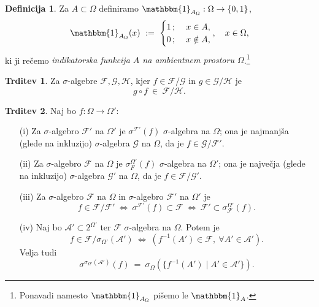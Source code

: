 \documentclass[11pt]{article}
\newcommand{\A}{\mathcal{A}}
\newcommand{\F}{\mathcal{F}}
\newcommand{\G}{\mathcal{G}}
\renewcommand{\H}{\mathcal{H}}
\newcommand{\set}[1]{\{#1\}}
\newcommand{\1}{\mathbbm{1}}
\theoremstyle{definition}
\newtheorem{definicija}{Definicija}[section]
\theoremstyle{definition}
\newtheorem{trditev}{Trditev}[section]
\theoremstyle{definition}
\theoremstyle{definition}
\begin{document}
\begin{definicija}

Za $A \subset \Omega$ definiramo $\1_{A_\Omega}: \Omega \rightarrow \set{0,1}$,
$$\1_{A_\Omega}(x) ~:=~ \begin{cases}
1\,; ~&x \in A, \\
0\,; ~&x \notin A,
\end{cases}, ~~~x \in \Omega,$$
ki ji rečemo \textit{indikatorska funkcija $A$ na ambientnem prostoru $\Omega$}.\footnote{Ponavadi namesto $\1_{A_\Omega}$ pišemo le $\1_A$.}

\end{definicija}
\vspace{0.5cm}

\begin{trditev}

Za $\sigma$-algebre $\F,\G,\H$, kjer $f \in \F/\G$ in $g \in \G/\H$ je
$$g \circ f ~\in~ \F/\H.$$

\end{trditev}
\vspace{0.5cm}

\begin{trditev}

Naj bo $f: \Omega \rightarrow \Omega'$:
\begin{enumerate}

\item[(i)] Za $\sigma$-algebro $\F'$ na $\Omega'$ je $\sigma^{\F'}(f)$ $\sigma$-algebra na $\Omega$; ona je najmanjša (glede na inkluzijo) $\sigma$-algebra $\G$ na $\Omega$, da je $f \in \G/\F'$.

\item[(ii)] Za $\sigma$-algebro $\F$ na $\Omega$ je $\sigma_F^{\Omega'}(f)$ $\sigma$-algebra na $\Omega'$; ona je največja (glede na inkluzijo) $\sigma$-algebra $\G'$ na $\Omega$, da je $f \in \F/\G'$.

\item[(iii)] Za $\sigma$-algebro $\F$ na $\Omega$ in $\sigma$-algebro $\F'$ na $\Omega'$ je
$$f \in \F/\F' ~\iff~ \sigma^{\F'}(f) \subset \F ~\iff~ \F' \subset \sigma_\F^{\Omega'}(f).$$

\item[(iv)] Naj bo $\A' \subset 2^{\Omega'}$ ter $\F$ $\sigma$-algebra na $\Omega$. Potem je
$$f \in \F/\sigma_{\Omega'}(\A') ~\iff~ (f^{-1}(A') \in \F, ~\forall A' \in \A').$$
Velja tudi 
$$\sigma^{\sigma_{\Omega'}(\A')}(f) ~=~ \sigma_\Omega(\set{f^{-1}(A') \mid A' \in \A'}).$$

\end{enumerate}

\end{trditev}
\vspace{0.5cm}
\end{document}
